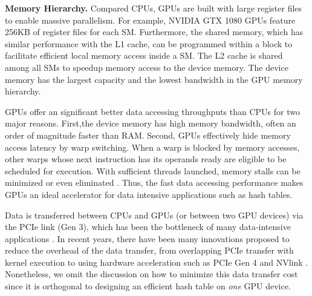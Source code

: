 \vspace{1mm}\noindent\textbf{Memory Hierarchy.} Compared CPUs, GPUs are built with large register files to enable massive parallelism. 
For example, NVIDIA GTX 1080 GPUs feature 256KB of register files for each SM. Furthermore, the shared memory, which has similar performance with the L1 cache, can be programmed within a block to facilitate efficient local memory access inside a SM.
The L2 cache is shared among all SMs to speedup memory access to the device memory. The device memory has the largest capacity and the lowest bandwidth in the GPU memory hierarchy.

GPUs offer an significant better data accessing throughputs than CPUs for two major reasons. 
First,the device memory has high memory bandwidth, often an order of magnitude faster than RAM.
Second, GPUs effectively hide memory access latency by warp switching. When a warp is blocked by memory accesses, other warps whose next instruction has its operands ready are eligible to be scheduled for execution. With sufficient threads launched, memory stalls can be minimized or even eliminated \cite{zhang2015mega}.
Thus, the fast data accessing performance makes GPUs an ideal accelerator for data intensive applications such as hash tables. 

Data is transferred between CPUs and GPUs (or between two GPU devices) via the PCIe link (Gen 3), which has been the bottleneck of many data-intensive applications \cite{zhang2015mega,kaldewey2012gpu,zhang2013omnidb}. In recent years, there have been many innovations proposed to reduce the overhead of the data transfer, from overlapping PCIe transfer with kernel execution to using hardware acceleration such as PCIe Gen 4 and NVlink \cite{thompto2016power9}. Nonetheless, we omit the discussion on how to minimize this data transfer cost since it is orthogonal to designing an efficient hash table on \emph{one} GPU device.

